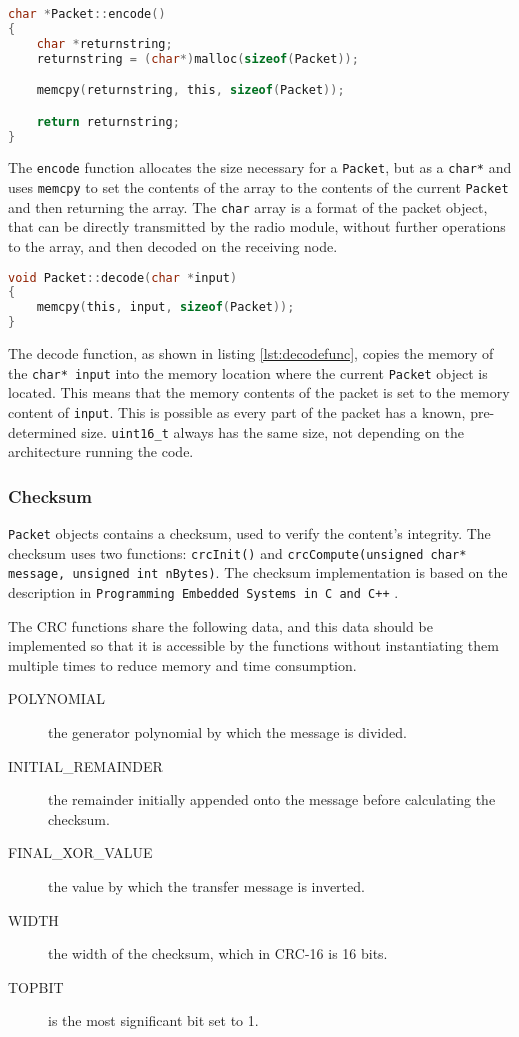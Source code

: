 \begin{lstlisting}[language=C, caption={Packet encode function.}]
char *Packet::encode()
{
    char *returnstring;
    returnstring = (char*)malloc(sizeof(Packet));

    memcpy(returnstring, this, sizeof(Packet));

    return returnstring;
}
\end{lstlisting}
The \texttt{encode} function allocates the size necessary for a \texttt{Packet}, but as a \texttt{char*} and uses \texttt{memcpy} to set the contents of the array to the contents of the current \texttt{Packet} and then returning the array. The \texttt{char} array is a format of the packet object, that can be directly transmitted by the radio module, without further operations to the array, and then decoded on the receiving node.

\begin{lstlisting}[language=C,label={lst:decodefunc},caption={Decode function.}]
void Packet::decode(char *input)
{
    memcpy(this, input, sizeof(Packet));
}
\end{lstlisting}
The decode function, as shown in listing \ref{lst:decodefunc}, copies the memory of the \texttt{char* input} into the memory location where the current \texttt{Packet} object is located. This means that the memory contents of the packet is set to the memory content of \texttt{input}. This is possible as every part of the packet has a known, pre-determined size. \texttt{uint16\_t} always has the same size, not depending on the architecture running the code.

\subsubsection{Checksum}
\texttt{Packet} objects contains a checksum, used to verify the content's integrity. The checksum uses two functions: \texttt{crcInit()} and \texttt{crcCompute(unsigned char* message, unsigned int nBytes)}. The checksum implementation is based on the description in \texttt{Programming Embedded Systems in C and C++} \cite{crcCode}.

The CRC functions share the following data, and this data should be implemented so that it is accessible by the functions without instantiating them multiple times to reduce memory and time consumption.

\begin{description}
	\item[POLYNOMIAL] the generator polynomial by which the message is divided.
	\item[INITIAL\_REMAINDER] the remainder initially appended onto the message before calculating the checksum.
	\item[FINAL\_XOR\_VALUE] the value by which the transfer message is inverted.
	\item[WIDTH] the width of the checksum, which in CRC-16 is 16 bits.
	\item[TOPBIT] is the most significant bit set to 1.
\end{description}

